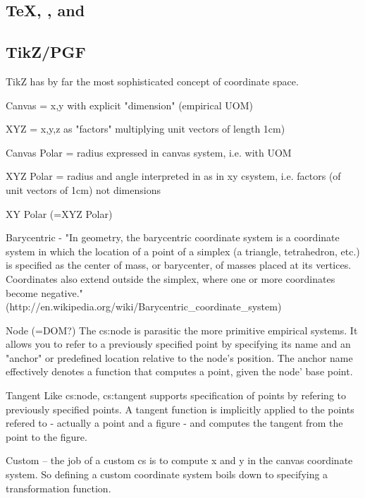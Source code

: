 \documentclass[12pt]{tufte-handout}
\numberwithin{equation}{subsection}
\numberwithin{equation}{subsection}
\begin{document}
\begin{appendices}
                \subsection{\TeX, \MF, and \MP}

                \subsection{TikZ/PGF}
                \label{subsec:tikz}

                TikZ has by far the most sophisticated concept of coordinate space.

                Canvas =  x,y with explicit "dimension" (empirical UOM)

                XYZ    =  x,y,z as "factors" multiplying unit vectors of length 1cm)

                Canvas Polar = radius expressed in canvas system, i.e. with UOM

                XYZ Polar  = radius and angle interpreted in as in xy csystem, i.e. factors (of unit vectors of 1cm) not dimensions

                XY Polar (=XYZ Polar)

                Barycentric  -  "In geometry, the barycentric coordinate system is a coordinate system in which the location of a point of a simplex (a triangle, tetrahedron, etc.) is specified as the center of mass, or barycenter, of masses placed at its vertices. Coordinates also extend outside the simplex, where one or more coordinates become negative."   (http://en.wikipedia.org/wiki/Barycentric\_coordinate\_system)

                Node (=DOM?)  The cs:node is parasitic the more primitive empirical
                systems.  It allows you to refer to a previously specified point by
                specifying its name and an "anchor" or predefined location relative to
                the node's position.  The anchor name effectively denotes a function
                that computes a point, given the node' base point.

                Tangent Like cs:node, cs:tangent supports specification of points by
                refering to previously specified points.  A tangent function is
                implicitly applied to the points refered to - actually a point and a
                figure - and computes the tangent from the point to the figure.

                Custom -- the job of a custom cs is to compute x and y in the canvas
                coordinate system.  So defining a custom coordinate system boils down
                to specifying a transformation function.


\end{appendices}
\end{document}
